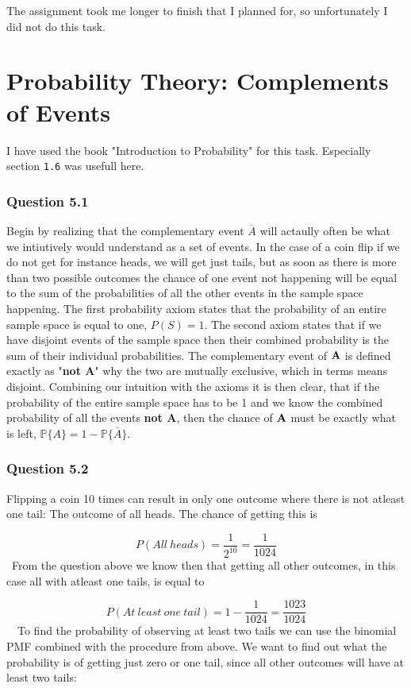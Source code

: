 \documentclass{article}
\begin{document}
The assignment took me longer to finish that I planned for, so unfortunately I
did not do this task.

\section{Probability Theory: Complements of Events}
I have used the book "Introduction to Probability" \cite{prob} for this
task. Especially section \texttt{1.6} was usefull here.

\subsubsection*{Question 5.1}
Begin by realizing that the complementary event \(\overline{A}\) will actaully
often be what we intiutively would understand as a set of events. In the case of
a coin flip if we do not get for instance heads, we will get just tails, but as
soon as there is more than two possible outcomes the chance of one event not
happening will be equal to the sum of the probabilities of all the other events
in the sample space happening. The first probability axiom states that the
probability of an entire sample space is equal to one, \(P(S) =
1\). The second axiom states that if we have disjoint events of the sample space
then their combined probability is the sum of their individual
probabilities. The complementary event of \({\mathbf A}\) is defined exactly as
"\textbf{not A}" why the two are mutually exclusive, which in terms means
disjoint. Combining our intuition with the axioms it is then clear, that if the
probability of the entire sample space has to be 1 and we know the combined
probability of all the events \textbf{not A}, then the chance of \({\mathbf A}\) must be
exactly what is left, \(\mathbb{P}\{A\} = 1 - \mathbb{P}\{\overline{A}\}\).


\subsubsection*{Question 5.2}
Flipping a coin 10 times can result in only one outcome where there is not
atleast one tail: The outcome of all heads. The chance of getting this is

\[
P(All\ heads) = \dfrac{1}{2^{10}}= \dfrac{1}{1024}
\]
\ From the question above we know then that getting all other outcomes, in this
case all with atleast one tails, is equal to

\[
P(At\ least\ one\ tail) = 1 - \dfrac{1}{1024} = \dfrac{1023}{1024}
\]
\ \ To find the probability of observing at least two tails we can use the
binomial PMF combined with the procedure from above. We want to find out what
the probability is of getting just zero or one tail, since all other outcomes
will have at least two tails:
\end{document}
